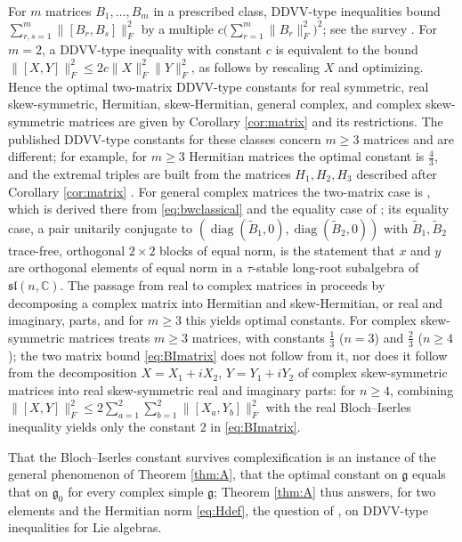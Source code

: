 \documentclass [leqno, 10pt]{amsart}
\theoremstyle{definition}
\numberwithin{equation}{section}
\newcommand{\sll}{\mathfrak{sl}}
\newcommand{\g}{\mathfrak{g}}
\newcommand{\com}{\mathbb C}
\newcommand{\gz}{\g_{0}}
\newcommand{\fnorm}[1]{\lVert #1\rVert_{F}}
\begin{document}
For $m$ matrices $B_{1}, \dots, B_{m}$ in a prescribed class, DDVV-type inequalities bound $\sum_{r, s = 1}^{m}\fnorm{[B_{r}, B_{s}]}^{2}$ by a multiple $c\big(\sum_{r=1}^{m}\fnorm{B_{r}}^{2}\big)^{2}$; see the survey \cite{Ge-Li-Tang-Zhou-survey}. For $m = 2$, a DDVV-type inequality with constant $c$ is equivalent to the bound $\fnorm{[X, Y]}^{2} \leq 2c\fnorm{X}^{2}\fnorm{Y}^{2}$, as follows by rescaling $X$ and optimizing. Hence the optimal two-matrix DDVV-type constants for real symmetric, real skew-symmetric, Hermitian, skew-Hermitian, general complex, and complex skew-symmetric matrices are given by Corollary \ref{cor:matrix} and its restrictions. The published DDVV-type constants for these classes \cite{Ge, Ge-Xu-You-Zhou, Ge-Li-Zhou} concern $m \geq 3$ matrices and are different; for example, for $m \geq 3$ Hermitian matrices the optimal constant is $\tfrac{4}{3}$, and the extremal triples are built from the matrices $H_{1}, H_{2}, H_{3}$ described after Corollary \ref{cor:matrix} \cite[Theorem 1.1]{Ge-Xu-You-Zhou}. For general complex matrices the two-matrix case is \cite[Theorem 2.3(2)]{Ge-Li-Zhou}, which is derived there from \eqref{eq:bwclassical} and the equality case of \cite{Cheng-Vong-Wenzel}; its equality case, a pair unitarily conjugate to $(\operatorname{diag}(\tilde{B}_{1}, 0), \operatorname{diag}(\tilde{B}_{2}, 0))$ with $\tilde{B}_{1}, \tilde{B}_{2}$ trace-free, orthogonal $2 \times 2$ blocks of equal norm, is the statement that $x$ and $y$ are orthogonal elements of equal norm in a $\tau$-stable long-root subalgebra of $\sll(n, \com)$. The passage from real to complex matrices in \cite{Ge-Li-Zhou} proceeds by decomposing a complex matrix into Hermitian and skew-Hermitian, or real and imaginary, parts, and for $m \geq 3$ this yields optimal constants. For complex skew-symmetric matrices \cite[Corollary 2.6]{Ge-Li-Zhou} treats $m \geq 3$ matrices, with constants $\tfrac{1}{3}$ ($n = 3$) and $\tfrac{2}{3}$ ($n \geq 4$); the two matrix bound \eqref{eq:BImatrix} does not follow from it, nor does it follow from the decomposition $X = X_{1} + iX_{2}$, $Y = Y_{1} + iY_{2}$ of complex skew-symmetric matrices into real skew-symmetric real and imaginary parts: for $n \geq 4$, combining $\fnorm{[X, Y]}^{2} \leq 2\sum_{a=1}^{2}\sum_{b=1}^{2}\fnorm{[X_{a}, Y_{b}]}^{2}$ with the real Bloch--Iserles inequality yields only the constant $2$ in \eqref{eq:BImatrix}. 

That the Bloch--Iserles constant survives complexification is an instance of the general phenomenon of Theorem \ref{thm:A}, that the optimal constant on $\g$ equals that on $\gz$ for every complex simple $\g$; Theorem \ref{thm:A} thus answers, for two elements and the Hermitian norm \eqref{eq:Hdef}, the question of \cite[Section 1, question (2)]{Ge-Li-Zhou}, \cite[Question 4.2]{Ge-Li-Tang-Zhou-survey} on DDVV-type inequalities for Lie algebras.
\end{document}
